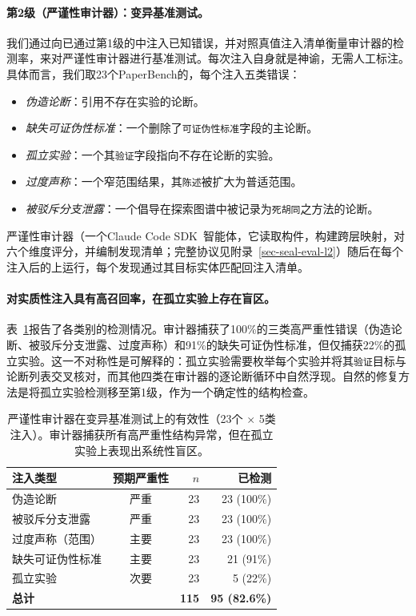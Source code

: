 \paragraph{第2级（严谨性审计器）：变异基准测试。}
我们通过向已通过第1级的\ara{}中注入已知错误，并对照真值注入清单衡量审计器的检测率，来对严谨性审计器进行基准测试。每次注入自身就是神谕，无需人工标注。具体而言，我们取23个PaperBench的\ara{}，每个注入五类错误：
\begin{itemize}[leftmargin=*, itemsep=1pt, topsep=2pt]
  \item \emph{伪造论断}：引用不存在实验的论断。
  \item \emph{缺失可证伪性标准}：一个删除了\texttt{可证伪性标准}字段的主论断。
  \item \emph{孤立实验}：一个其\texttt{验证}字段指向不存在论断的实验。
  \item \emph{过度声称}：一个窄范围结果，其\texttt{陈述}被扩大为普适范围。
  \item \emph{被驳斥分支泄露}：一个倡导在探索图谱中被记录为\texttt{死胡同}之方法的论断。
\end{itemize}
严谨性审计器（一个Claude Code SDK~\citep{claudecodesdk2025}智能体，它读取构件，构建跨层映射，对六个维度评分，并编制发现清单；完整协议见附录~\ref{sec-seal-eval-l2}）随后在每个注入后的\ara{}上运行，每个发现通过其目标实体匹配回注入清单。

\paragraph{对实质性注入具有高召回率，在孤立实验上存在盲区。}
表~\ref{tbl-seal-l2}报告了各类别的检测情况。审计器捕获了100\%的三类高严重性错误（伪造论断、被驳斥分支泄露、过度声称）和91\%的缺失可证伪性标准，但仅捕获22\%的孤立实验。这一不对称性是可解释的：孤立实验需要枚举每个实验并将其\texttt{验证}目标与论断列表交叉核对，而其他四类在审计器的逐论断循环中自然浮现。自然的修复方法是将孤立实验检测移至第1级，作为一个确定性的结构检查。

\begin{table}[t]
\centering
\small
\begin{tabular}{l c r r}
\toprule
\textbf{注入类型} & \textbf{预期严重性} & \textbf{$n$} & \textbf{已检测} \\
\midrule
伪造论断        & 严重 & 23 & 23 (100\%) \\
被驳斥分支泄露    & 严重 & 23 & 23 (100\%) \\
过度声称（范围）      & 主要    & 23 & 23 (100\%) \\
缺失可证伪性标准   & 主要    & 23 & 21 (91\%) \\
孤立实验       & 次要    & 23 &  5 (22\%) \\
\midrule
\textbf{总计}        &          & \textbf{115} & \textbf{95 (82.6\%)} \\
\bottomrule
\end{tabular}
\caption{严谨性审计器在变异基准测试上的有效性（23个\ara{} $\times$ 5类注入）。审计器捕获所有高严重性结构异常，但在孤立实验上表现出系统性盲区。}
\label{tbl-seal-l2}
\end{table}

